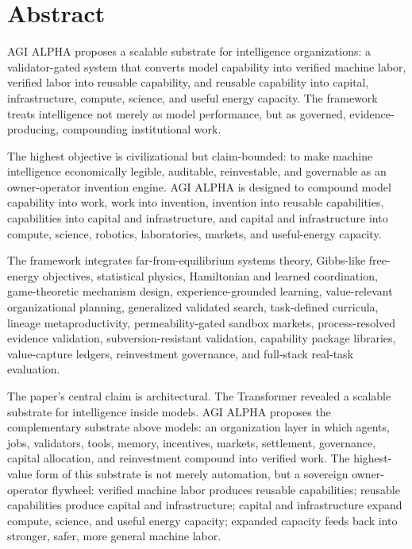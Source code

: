 \documentclass[11pt]{article}
\begin{document}
\section{Abstract}\label{abstract}

AGI ALPHA proposes a scalable substrate for intelligence organizations: a validator-gated system that converts model capability into verified machine labor, verified labor into reusable capability, and reusable capability into capital, infrastructure, compute, science, and useful energy capacity. The framework treats intelligence not merely as model performance, but as governed, evidence-producing, compounding institutional work.

The highest objective is civilizational but claim-bounded: to make machine intelligence economically legible, auditable, reinvestable, and governable as an owner-operator invention engine. AGI ALPHA is designed to compound model capability into work, work into invention, invention into reusable capabilities, capabilities into capital and infrastructure, and capital and infrastructure into compute, science, robotics, laboratories, markets, and useful-energy capacity.

The framework integrates far-from-equilibrium systems theory, Gibbs-like free-energy objectives, statistical physics, Hamiltonian and learned coordination, game-theoretic mechanism design, experience-grounded learning, value-relevant organizational planning, generalized validated search, task-defined curricula, lineage metaproductivity, permeability-gated sandbox markets, process-resolved evidence validation, subversion-resistant validation, capability package libraries, value-capture ledgers, reinvestment governance, and full-stack real-task evaluation.

The paper's central claim is architectural. The Transformer revealed a scalable substrate for intelligence inside models. AGI ALPHA proposes the complementary substrate above models: an organization layer in which agents, jobs, validators, tools, memory, incentives, markets, settlement, governance, capital allocation, and reinvestment compound into verified work. The highest-value form of this substrate is not merely automation, but a sovereign owner-operator flywheel: verified machine labor produces reusable capabilities; reusable capabilities produce capital and infrastructure; capital and infrastructure expand compute, science, and useful energy capacity; expanded capacity feeds back into stronger, safer, more general machine labor.
\end{document}
